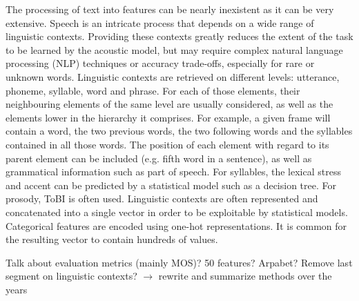 \documentclass[a4paper, oneside, 12pt, english]{article}
\begin{document}
The processing of text into features can be nearly inexistent as it can be very extensive. Speech is an intricate process that depends on a wide range of linguistic contexts. Providing these contexts greatly reduces the extent of the task to be learned by the acoustic model, but may require complex natural language processing (NLP) techniques or accuracy trade-offs, especially for rare or unknown words. Linguistic contexts are retrieved on different levels: utterance, phoneme, syllable, word and phrase. For each of those elements, their neighbouring elements of the same level are usually considered, as well as the elements lower in the hierarchy it comprises. For example, a given frame will contain a word, the two previous words, the two following words and the syllables contained in all those words. The position of each element with regard to its parent element can be included (e.g. fifth word in a sentence), as well as grammatical information such as part of speech. For syllables, the lexical stress and accent can be predicted by a statistical model such as a decision tree. For prosody, ToBI \citep{TOBI} is often used. Linguistic contexts are often represented and concatenated into a single vector in order to be exploitable by statistical models. Categorical features are encoded using one-hot representations. It is common for the resulting vector to contain hundreds of values.

\color{red}Talk about evaluation metrics (mainly MOS)? 50 features? Arpabet? Remove last segment on linguistic contexts? $\rightarrow$ rewrite and summarize methods over the years\color{black}
\end{document}
